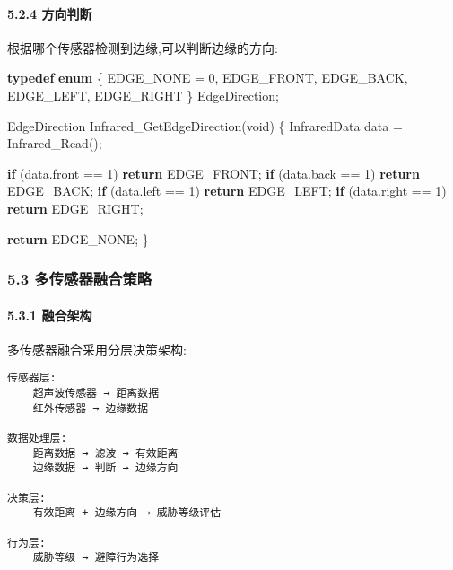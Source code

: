 \documentclass[
]{article}
\newenvironment{Shaded}{}{}
\newcommand{\ControlFlowTok}[1]{\textcolor[rgb]{0.00,0.44,0.13}{\textbf{#1}}}
\newcommand{\DataTypeTok}[1]{\textcolor[rgb]{0.56,0.13,0.00}{#1}}
\newcommand{\DecValTok}[1]{\textcolor[rgb]{0.25,0.63,0.44}{#1}}
\newcommand{\KeywordTok}[1]{\textcolor[rgb]{0.00,0.44,0.13}{\textbf{#1}}}
\newcommand{\NormalTok}[1]{#1}
\begin{document}
\hypertarget{ux65b9ux5411ux5224ux65ad}{%
\paragraph{5.2.4 方向判断}\label{ux65b9ux5411ux5224ux65ad}}

根据哪个传感器检测到边缘,可以判断边缘的方向:

\begin{Shaded}
\begin{Highlighting}[]
\KeywordTok{typedef} \KeywordTok{enum}\NormalTok{ \{}
\NormalTok{    EDGE\_NONE = }\DecValTok{0}\NormalTok{,}
\NormalTok{    EDGE\_FRONT,}
\NormalTok{    EDGE\_BACK,}
\NormalTok{    EDGE\_LEFT,}
\NormalTok{    EDGE\_RIGHT}
\NormalTok{\} EdgeDirection;}

\NormalTok{EdgeDirection Infrared\_GetEdgeDirection(}\DataTypeTok{void}\NormalTok{)}
\NormalTok{\{}
\NormalTok{    InfraredData data = Infrared\_Read();}
    
    \ControlFlowTok{if}\NormalTok{ (data.front == }\DecValTok{1}\NormalTok{) }\ControlFlowTok{return}\NormalTok{ EDGE\_FRONT;}
    \ControlFlowTok{if}\NormalTok{ (data.back == }\DecValTok{1}\NormalTok{) }\ControlFlowTok{return}\NormalTok{ EDGE\_BACK;}
    \ControlFlowTok{if}\NormalTok{ (data.left == }\DecValTok{1}\NormalTok{) }\ControlFlowTok{return}\NormalTok{ EDGE\_LEFT;}
    \ControlFlowTok{if}\NormalTok{ (data.right == }\DecValTok{1}\NormalTok{) }\ControlFlowTok{return}\NormalTok{ EDGE\_RIGHT;}
    
    \ControlFlowTok{return}\NormalTok{ EDGE\_NONE;}
\NormalTok{\}}
\end{Highlighting}
\end{Shaded}

\hypertarget{ux591aux4f20ux611fux5668ux878dux5408ux7b56ux7565}{%
\subsubsection{5.3
多传感器融合策略}\label{ux591aux4f20ux611fux5668ux878dux5408ux7b56ux7565}}

\hypertarget{ux878dux5408ux67b6ux6784}{%
\paragraph{5.3.1 融合架构}\label{ux878dux5408ux67b6ux6784}}

多传感器融合采用分层决策架构:

\begin{verbatim}
传感器层:
    超声波传感器 → 距离数据
    红外传感器 → 边缘数据

数据处理层:
    距离数据 → 滤波 → 有效距离
    边缘数据 → 判断 → 边缘方向

决策层:
    有效距离 + 边缘方向 → 威胁等级评估

行为层:
    威胁等级 → 避障行为选择
\end{verbatim}
\end{document}
